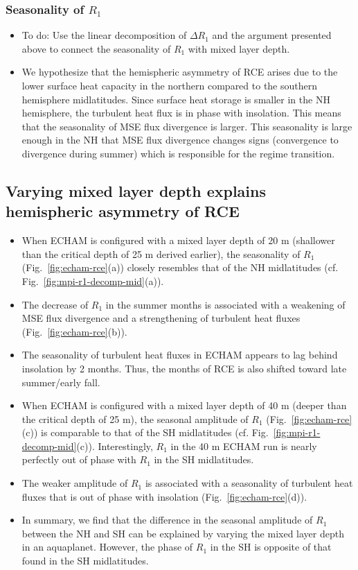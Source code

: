 \documentclass{ametsocV5}
\begin{document}
        \subsubsection{Seasonality of $R_{1}$}
        \begin{itemize}
          \item To do: Use the linear decomposition of $\Delta R_1$ and the argument presented above to connect the seasonality of $R_1$ with mixed layer depth.
          \item We hypothesize that the hemispheric asymmetry of RCE arises due to the lower surface heat capacity in the northern compared to the southern hemisphere midlatitudes. Since surface heat storage is smaller in the NH hemisphere, the turbulent heat flux is in phase with insolation. This means that the seasonality of MSE flux divergence is larger. This seasonality is large enough in the NH that MSE flux divergence changes signs (convergence to divergence during summer) which is responsible for the regime transition.
        \end{itemize}

\subsection{Varying mixed layer depth explains hemispheric asymmetry of RCE}
\begin{itemize}
  \item When ECHAM is configured with a mixed layer depth of 20 m (shallower than the critical depth of 25 m derived earlier), the seasonality of \(R_{1}\) (Fig.~\ref{fig:echam-rce}(a)) closely resembles that of the NH midlatitudes (cf. Fig.~\ref{fig:mpi-r1-decomp-mid}(a)).
  \item The decrease of \(R_{1}\) in the summer months is associated with a weakening of MSE flux divergence and a strengthening of turbulent heat fluxes (Fig.~\ref{fig:echam-rce}(b)).
  \item The seasonality of turbulent heat fluxes in ECHAM appears to lag behind insolation by 2 months. Thus, the months of RCE is also shifted toward late summer/early fall.
  \item When ECHAM is configured with a mixed layer depth of 40 m (deeper than the critical depth of 25 m), the seasonal amplitude of \(R_{1}\) (Fig.~\ref{fig:echam-rce}(c)) is comparable to that of the SH midlatitudes (cf. Fig.~\ref{fig:mpi-r1-decomp-mid}(c)). Interestingly, \(R_{1}\) in the 40 m ECHAM run is nearly perfectly out of phase with \(R_{1}\) in the SH midlatitudes.
  \item The weaker amplitude of \(R_{1}\) is associated with a seasonality of turbulent heat fluxes that is out of phase with insolation (Fig.~\ref{fig:echam-rce}(d)).
  \item In summary, we find that the difference in the seasonal amplitude of \(R_{1}\) between the NH and SH can be explained by varying the mixed layer depth in an aquaplanet. However, the phase of \(R_{1}\) in the SH is opposite of that found in the SH midlatitudes.
\end{itemize}
\end{document}
